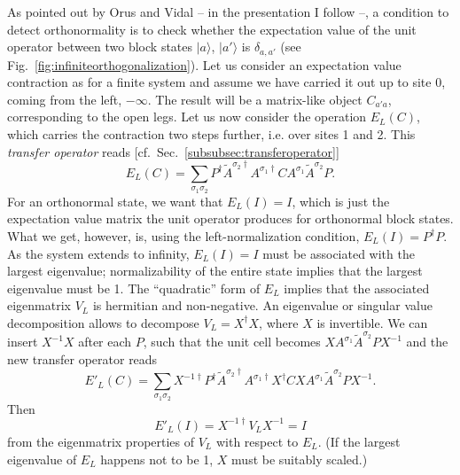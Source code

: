 \documentclass[a4paper,10pt,oneside,onecolumn,1p,times]{elsarticle}
\newcommand{\ket}[1]{\mbox{$| #1  \rangle$}}
\begin{document}
As pointed out by Orus and Vidal\cite{Orus08} -- in the presentation I follow \cite{McCulloch08} --, a condition to detect orthonormality is to check whether the expectation value of the unit operator between two block states $\ket{a}$, $\ket{a'}$ is $\delta_{a,a'}$ (see Fig.~\ref{fig:infiniteorthogonalization}). Let us consider an expectation value contraction as for a finite system and assume we have carried it out up to site $0$, coming from the left, $-\infty$. The result will be a matrix-like object $C_{a'a}$, corresponding to the open legs. Let us now consider the operation $E_L(C)$, which carries the contraction two steps further, i.e. over sites 1 and 2. This {\em transfer operator} reads [cf.\ Sec.~\ref{subsubsec:transferoperator}]
\begin{equation}
E_L(C) = \sum_{\sigma_1\sigma_2} P^\dagger \tilde{A}^{\sigma_2\dagger} A^{\sigma_1\dagger} C A^{\sigma_1} \tilde{A}^{\sigma_2} P.
\end{equation}
For an orthonormal state, we want that $E_L(I) = I$, which is just the expectation value matrix the unit operator produces for orthonormal block states. What we get, however, is, using the left-normalization condition, $E_L(I)=P^\dagger P$. As the system extends to infinity, $E_L(I) = I$ must be associated with the largest eigenvalue; normalizability of the entire state implies that the largest eigenvalue must be 1. The ``quadratic'' form of $E_L$ implies that the associated eigenmatrix $V_L$ is hermitian and non-negative. An eigenvalue or singular value decomposition allows to decompose $V_L = X^\dagger X$, where $X$ is invertible. We can insert $X^{-1}X$ after each $P$, such that the unit cell becomes $X A^{\sigma_1} \tilde{A}^{\sigma_2} P X^{-1}$ and the new transfer operator reads
\begin{equation}
E'_L(C) = \sum_{\sigma_1\sigma_2} X^{-1\dagger}P^\dagger \tilde{A}^{\sigma_2\dagger} A^{\sigma_1\dagger} X^\dagger C X A^{\sigma_1} \tilde{A}^{\sigma_2} P X^{-1}.
\end{equation}
Then 
\begin{equation}
E'_L(I) = X^{-1\dagger} V_L X^{-1} = I
\end{equation}
from the eigenmatrix properties of $V_L$ with respect to $E_L$.
(If the largest eigenvalue of $E_L$ happens not to be 1, $X$ must be suitably scaled.)
\end{document}
